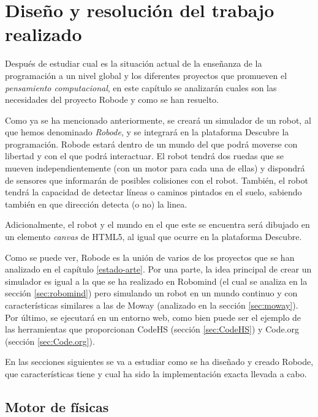 \chapter{Diseño y resolución del trabajo realizado}
\label{diseno}

Después de estudiar cual es la situación actual de la enseñanza de la programación a un nivel global y los diferentes proyectos que promueven el \emph{pensamiento computacional}, en este capítulo se analizarán cuales son las necesidades del proyecto Robode y como se han resuelto.

Como ya se ha mencionado anteriormente, se creará un simulador de un robot, al que hemos denominado \emph{Robode}, y se integrará en la plataforma Descubre la programación. Robode  estará dentro de un mundo del que podrá moverse con libertad y con el que podrá interactuar. El robot tendrá dos ruedas que se mueven independientemente (con un motor para cada una de ellas) y dispondrá de sensores que informarán de posibles colisiones con el robot. También, el robot tendrá la capacidad de detectar líneas o caminos pintados en el suelo, sabiendo también en que dirección detecta (o no) la linea.

Adicionalmente, el robot y el mundo en el que este se encuentra será dibujado en un elemento \emph{canvas} de HTML5, al igual que ocurre en la plataforma Descubre.


Como se puede ver, Robode es la unión de varios de los proyectos que se han analizado en el capítulo \ref{estado-arte}. Por una parte, la idea principal de crear un simulador es igual a la que se ha realizado en Robomind (el cual se analiza en la sección \ref{sec:robomind}) pero simulando un robot en un mundo continuo y con características similares a las de Moway (analizado en la sección \ref{sec:moway}). Por último, se ejecutará en un entorno web, como bien puede ser el ejemplo de las herramientas que proporcionan CodeHS (sección \ref{sec:CodeHS}) y Code.org (sección \ref{sec:Code.org}). 


En las secciones siguientes se va a estudiar como se ha diseñado y creado Robode, que características tiene y cual ha sido la implementación exacta llevada a cabo.



\section{Motor de físicas}
\label{sec:mundo}


